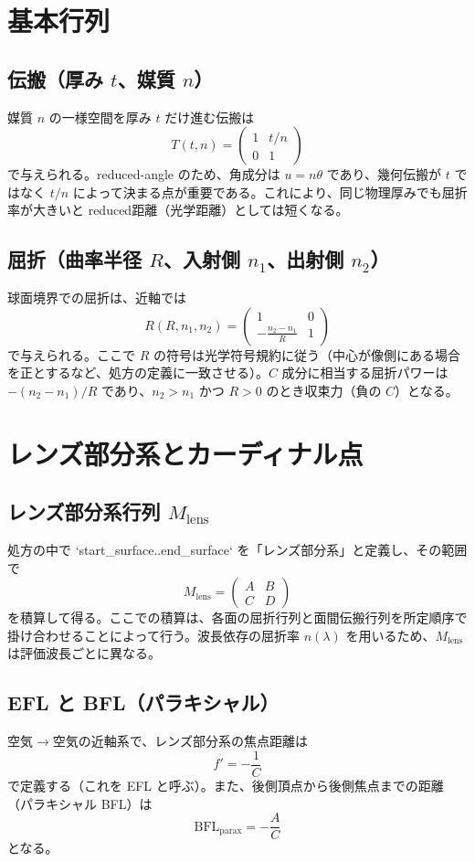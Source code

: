 \section{基本行列}

\subsection{伝搬（厚み $t$、媒質 $n$）}
媒質 $n$ の一様空間を厚み $t$ だけ進む伝搬は
\[
T(t,n)=\begin{pmatrix}1 & t/n\\0&1\end{pmatrix}
\]
で与えられる。reduced-angle のため、角成分は $u=n\theta$ であり、幾何伝搬が $t$ ではなく \textbf{$t/n$} によって決まる点が重要である。これにより、同じ物理厚みでも屈折率が大きいと reduced距離（光学距離）としては短くなる。

\subsection{屈折（曲率半径 $R$、入射側 $n_1$、出射側 $n_2$）}
球面境界での屈折は、近軸では
\[
R(R,n_1,n_2)=\begin{pmatrix}1 & 0\\-\frac{n_2-n_1}{R} & 1\end{pmatrix}
\]
で与えられる。ここで $R$ の符号は光学符号規約に従う（中心が像側にある場合を正とするなど、処方の定義に一致させる）。$C$ 成分に相当する屈折パワーは $-(n_2-n_1)/R$ であり、$n_2>n_1$ かつ $R>0$ のとき収束力（負の $C$）となる。

\section{レンズ部分系とカーディナル点}

\subsection{レンズ部分系行列 $M_{\mathrm{lens}}$}
処方の中で `start_surface..end_surface` を「レンズ部分系」と定義し、その範囲で
\[
M_{\mathrm{lens}}=\begin{pmatrix}A&B\\C&D\end{pmatrix}
\]
を積算して得る。ここでの積算は、各面の屈折行列と面間伝搬行列を所定順序で掛け合わせることによって行う。波長依存の屈折率 $n(\lambda)$ を用いるため、$M_{\mathrm{lens}}$ は評価波長ごとに異なる。

\subsection{EFL と BFL（パラキシャル）}
空気$\to$空気の近軸系で、レンズ部分系の焦点距離は
\[
f' = -\frac{1}{C}
\]
で定義する（これを EFL と呼ぶ）。また、後側頂点から後側焦点までの距離（パラキシャル BFL）は
\[
\mathrm{BFL}_{\mathrm{parax}} = -\frac{A}{C}
\]
となる。

